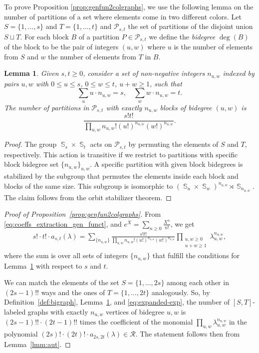 \documentclass[english]{ourlematemasingle}
\numberwithin{theorem}{section}
\newtheorem{lemma}[theorem]{Lemma}
\theoremstyle{remark}
\newcommand{\PP}{\mathcal{P}}
\DeclareMathOperator{\SG}{{\mathbb S}}
\begin{document}
To prove Proposition \ref{prop:genfun2colgraphs}, we use the following lemma on the number of partitions of a set where elements come in two different colors.
Let $S = \{1,\ldots,s\}$ and $T = \{1,\ldots,t\}$ and $\PP_{s,t}$ the set of partitions of the disjoint union $S\sqcup T$.
For each block $B$ of a partition $P \in \PP_{s,t}$ we define the \emph{bidegree} $\deg(B)$ of the block to be the pair of integers $(u,w)$ 
where $u$ is the number of elements from $S$ and $w$ the number of elements from $T$ in $B$.
\begin{lemma}
\label{lmm:biparititons}
Given $s,t \geq 0$, consider a set of non-negative integers $n_{u,w}$ indexed by pairs $u,w$ with $0 \leq u \leq s$, $0 \leq w \leq t$, $u+w \geq 1$, such that 
\[
\sum_{u} u \cdot n_{u,w} = s, \quad \sum_{w} w \cdot  n_{u,w} = t.
\]
The number of partitions in $\PP_{s,t}$ with exactly $n_{u,w}$ blocks of bidegree $(u,w)$ is
\[
\frac{s!t!}{\prod_{u,w} n_{u,w}! (u!)^{n_{u,w}} (w!)^{n_{u,w}}}.
\]
\end{lemma}
\begin{proof}
The group $\SG_{s} \times \SG_{t}$ acts on $\PP_{s,t}$ by permuting the elements of $S$ and $T$, respectively. This action is transitive if we restrict to partitions with specific block bidegree set $\{n_{u,w}\}_{u,w}$. A specific partition with given block bidegrees is stabilized by the subgroup that permutes the elements inside each block and blocks of the same size. This subgroup is isomorphic to $(\SG_{u} \times \SG_{w})^{n_{u,w}} \rtimes \SG_{n_{u,w}}$. The claim follows from the orbit stabilizer theorem.
\end{proof}
\begin{proof}[Proof of Proposition~\ref{prop:genfun2colgraphs}]
From \eqref{eq:coeffs_extraction_gen_funct},
and $e^X = \sum_{n \geq 0} \frac{X^n}{n!}$, we get 
\begin{align}
\label{eq:expanded-exp}
s! \cdot t! \cdot a_{s,t}(\lambda) = 
\sum_{\{n_{u,w}\}}
\frac{s!t!}{\prod_{u,w} n_{u,w}! (u!)^{n_{u,w}} (w!)^{n_{u,w}}}
\prod_{\substack{u,w\geq 0\\ u+w \geq 1}} \lambda_{u,w}^{n_{u,w}},
\end{align}
where the sum is over all sets of integers $\{n_{u,w}\}$ that fulfill the conditions for Lemma~\ref{lmm:biparititons} with respect to $s$ and $t$.\par 

We can match the elements of the set $S=\{1,\ldots,2s\}$ among each other in $(2s-1)!!$ ways and the ones of $T=\{1,\ldots,2t\}$ analogously. 
So, by Definition~\ref{def:bigraph}, Lemma~\ref{lmm:biparititons}, and \eqref{eq:expanded-exp}, the number of $[S,T]$-labeled graphs with exactly $n_{u,w}$ vertices of bidegree $u,w$ is $(2s-1)!! \cdot (2t-1)!!$ times the coefficient of the monomial 
$\prod_{u,w} \lambda_{u,w}^{n_{u,w}}$ in 
the polynomial  $(2s)! \cdot (2t)! \cdot a_{2s,2t}(\lambda) \in \mathcal R$.
The statement follows then from Lemma~\ref{lmm:aut}.
\end{proof}
\end{document}
